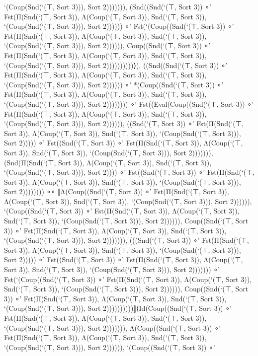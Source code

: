 \documentclass{article}
\begin{document}
\begin{leancode}
`(Coup(Snd(`(⊤, Sort 3))), Sort 2))))))), (Snd((Snd(`(⊤, Sort 3)) ∘' Fst(Π(Snd(`(⊤, Sort 3)), Λ(Coup(`(⊤, Sort 3)), Snd(`(⊤, Sort 3)), `(Coup(Snd(`(⊤, Sort 3))), Sort 2)))))) ∘'
Fst(`(Coup((Snd(`(⊤, Sort 3)) ∘' Fst(Π(Snd(`(⊤, Sort 3)), Λ(Coup(`(⊤, Sort 3)), Snd(`(⊤, Sort 3)),
`(Coup(Snd(`(⊤, Sort 3))), Sort 2)))))), Coup((Snd(`(⊤, Sort 3)) ∘' Fst(Π(Snd(`(⊤, Sort 3)),
Λ(Coup(`(⊤, Sort 3)), Snd(`(⊤, Sort 3)), `(Coup(Snd(`(⊤, Sort 3))), Sort 2))))))))))⟩),
((Snd((Snd(`(⊤, Sort 3)) ∘' Fst(Π(Snd(`(⊤, Sort 3)), Λ(Coup(`(⊤, Sort 3)), Snd(`(⊤, Sort 3)), `(Coup(Snd(`(⊤, Sort 3))), Sort 2)))))) ∘' *(Coup((Snd(`(⊤, Sort 3)) ∘' Fst(Π(Snd(`(⊤, Sort 3)),
Λ(Coup(`(⊤, Sort 3)), Snd(`(⊤, Sort 3)), `(Coup(Snd(`(⊤, Sort 3))), Sort 2)))))))) ∘' Fst((Eval(Coup((Snd(`(⊤, Sort 3)) ∘' Fst(Π(Snd(`(⊤, Sort 3)), Λ(Coup(`(⊤, Sort 3)), Snd(`(⊤, Sort 3)), `(Coup(Snd(`(⊤, Sort 3))), Sort 2)))))),
((Snd(`(⊤, Sort 3)) ∘' Fst(Π(Snd(`(⊤, Sort 3)), Λ(Coup(`(⊤, Sort 3)), Snd(`(⊤, Sort 3)), `(Coup(Snd(`(⊤, Sort 3))), Sort 2))))) ∘' Fst((Snd(`(⊤, Sort 3)) ∘' Fst(Π(Snd(`(⊤, Sort 3)),
Λ(Coup(`(⊤, Sort 3)), Snd(`(⊤, Sort 3)), `(Coup(Snd(`(⊤, Sort 3))), Sort 2))))))), (Snd(Π(Snd(`(⊤, Sort 3)), Λ(Coup(`(⊤, Sort 3)), Snd(`(⊤, Sort 3)), `(Coup(Snd(`(⊤, Sort 3))), Sort 2)))) ∘' Fst((Snd(`(⊤, Sort 3)) ∘'
Fst(Π(Snd(`(⊤, Sort 3)), Λ(Coup(`(⊤, Sort 3)), Snd(`(⊤, Sort 3)), `(Coup(Snd(`(⊤, Sort 3))), Sort 2)))))))) ∘∘ ⟦Λ(Coup((Snd(`(⊤, Sort 3)) ∘' Fst(Π(Snd(`(⊤, Sort 3)), Λ(Coup(`(⊤, Sort 3)), Snd(`(⊤, Sort 3)),
`(Coup(Snd(`(⊤, Sort 3))), Sort 2)))))), `(Coup((Snd(`(⊤, Sort 3)) ∘' Fst(Π(Snd(`(⊤, Sort 3)), Λ(Coup(`(⊤, Sort 3)), Snd(`(⊤, Sort 3)), `(Coup(Snd(`(⊤, Sort 3))), Sort 2)))))), Coup((Snd(`(⊤, Sort 3)) ∘'
Fst(Π(Snd(`(⊤, Sort 3)), Λ(Coup(`(⊤, Sort 3)), Snd(`(⊤, Sort 3)), `(Coup(Snd(`(⊤, Sort 3))), Sort 2))))))), (((Snd(`(⊤, Sort 3)) ∘' Fst(Π(Snd(`(⊤, Sort 3)), Λ(Coup(`(⊤, Sort 3)), Snd(`(⊤, Sort 3)),
`(Coup(Snd(`(⊤, Sort 3))), Sort 2))))) ∘' Fst((Snd(`(⊤, Sort 3)) ∘' Fst(Π(Snd(`(⊤, Sort 3)), Λ(Coup(`(⊤, Sort 3)), Snd(`(⊤, Sort 3)), `(Coup(Snd(`(⊤, Sort 3))), Sort 2))))))) ∘' Fst(`(Coup((Snd(`(⊤, Sort 3)) ∘'
Fst(Π(Snd(`(⊤, Sort 3)), Λ(Coup(`(⊤, Sort 3)), Snd(`(⊤, Sort 3)), `(Coup(Snd(`(⊤, Sort 3))), Sort 2)))))), Coup((Snd(`(⊤, Sort 3)) ∘' Fst(Π(Snd(`(⊤, Sort 3)), Λ(Coup(`(⊤, Sort 3)), Snd(`(⊤, Sort 3)),
`(Coup(Snd(`(⊤, Sort 3))), Sort 2))))))))))⟧⟨Id(Coup((Snd(`(⊤, Sort 3)) ∘' Fst(Π(Snd(`(⊤, Sort 3)), Λ(Coup(`(⊤, Sort 3)), Snd(`(⊤, Sort 3)), `(Coup(Snd(`(⊤, Sort 3))),
Sort 2))))))), Λ(Coup((Snd(`(⊤, Sort 3)) ∘' Fst(Π(Snd(`(⊤, Sort 3)), Λ(Coup(`(⊤, Sort 3)),
Snd(`(⊤, Sort 3)), `(Coup(Snd(`(⊤, Sort 3))), Sort 2)))))), `(Coup((Snd(`(⊤, Sort 3)) ∘'

\end{leancode}
\end{document}
